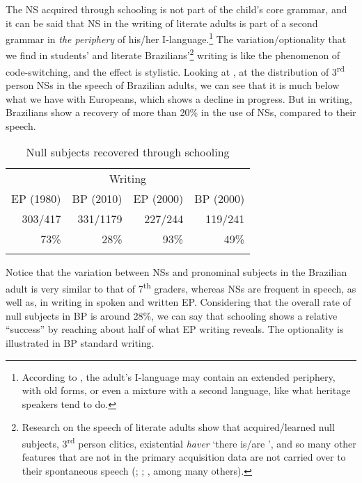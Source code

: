 \documentclass[output=paper,colorlinks,citecolor=brown]{langscibook}
\begin{document}
   \z

\z

The NS acquired through schooling is not part of the child’s core grammar, and it can be said that NS in the writing of literate adults is part of a second grammar in \emph{the periphery} of his/her I-language.\footnote{According to \citet{chomsky_language_1988}, the adult’s I-language may contain an extended periphery, with old forms, or even a mixture with a second language, like what heritage speakers tend to do.} The variation/optionality that we find in students’ and literate Brazilians’\footnote{Research on the speech of literate adults show that acquired/learned null subjects, 3\textsuperscript{rd} person clitics, existential \emph{haver} ‘there is/are ', and so many other features that are not in the primary acquisition data are not carried over to their spontaneous speech  (\citealt{duarte1995}; \citealt{freire_os_2000}; \citealt{duarte_o_2003}, among many others).} writing is like the phenomenon of code-switching, and the effect is stylistic. Looking at , at the distribution of 3\textsuperscript{rd} person NSs in the speech of Brazilian adults, we can see that it is much below what we have with Europeans, which shows a decline in progress. But in writing, Brazilians show a recovery of more than 20\% in the use of NSs, compared to their speech.

\begin{table}
\caption{Null subjects recovered through schooling \citep{magalhaes_aprendendo_2000}}
\label{03:table3}
 \begin{tabular}{rrrr}
  \lsptoprule
  \multicolumn{2}{c}{Speech} &\multicolumn{2}{c}{Writing} \\
  \cmidrule(lr){1-2}\cmidrule(lr){3-4}
EP (1980)&BP (2010)&EP (2000)&BP (2000)\\
\midrule
303/417 &331/1179& 227/244&119/241\\
73\%&28\%&93\%&49\%\\
  \lspbottomrule
 \end{tabular}
\end{table}

Notice that the variation between NSs and pronominal subjects in the Brazilian adult is very similar to that of 7\textsuperscript{th} graders, whereas NSs are frequent in speech, as well as, in writing in spoken and written EP. Considering that the overall rate of null subjects in BP is around 28\%, we can say that schooling shows a relative ``success'' by reaching about half of what EP writing reveals. The optionality is illustrated in BP standard writing.
\end{document}
